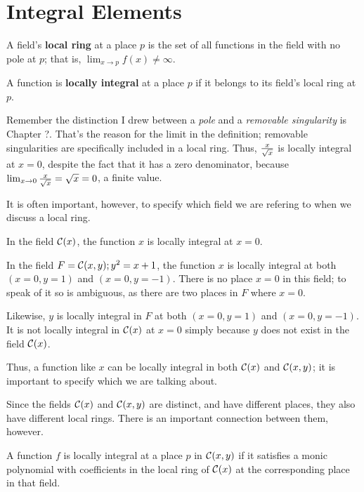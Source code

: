 
\section{Integral Elements}


A field's {\bf local ring} at a place $p$ is the set of
all functions in the field with no pole at $p$; that
is, $ \lim_{x\to p} f(x) \ne \infty $.

A function is {\bf locally integral} at a place $p$
if it belongs to its field's local ring at $p$.

\enddefinition

Remember the distinction I drew between a {\it pole} and a {\it
removable singularity} is Chapter ?.  That's the reason for the limit
in the definition; removable singularities are specifically included
in a local ring.  Thus, $x\over\sqrt{x}$ is locally integral at $x=0$,
despite the fact that it has a zero denominator, because
$\lim_{x\to0}{x\over\sqrt{x}}=\sqrt{x}=0$, a finite value.

It is often important, however, to specify which field we are
refering to when we discuss a local ring.

\example \quad

In the field ${\cal C}(x)$, the function $x$ is locally integral at $x=0$.

In the field $F = {{\cal C}(x,y); y^2=x+1}$, the function $x$ is locally integral
at both $(x=0, y=1)$ and $(x=0, y=-1)$.  There is no place $x=0$ in
this field; to speak of it so is ambiguous, as there are two places
in $F$ where $x=0$.

Likewise, $y$ is locally integral in $F$ at both $(x=0, y=1)$ and
$(x=0, y=-1)$.  It is not locally integral in ${\cal C}(x)$ at $x=0$ simply
because $y$ does not exist in the field ${\cal C}(x)$.

\endexample

Thus, a function like $x$ can be locally integral in both ${\cal C}(x)$ and
${\cal C}(x,y)$; it is important to specify which we are talking about.

Since the fields ${\cal C}(x)$ and ${\cal C}(x,y)$ are distinct, and have different
places, they also have different local rings.  There is an important
connection between them, however.

\theorem
\label{local integral polynomial}

A function $f$ is locally integral at a place $p$ in ${\cal C}(x,y)$ if it
satisfies a monic polynomial with coefficients in the local ring of
${\cal C}(x)$ at the corresponding place in that field.

